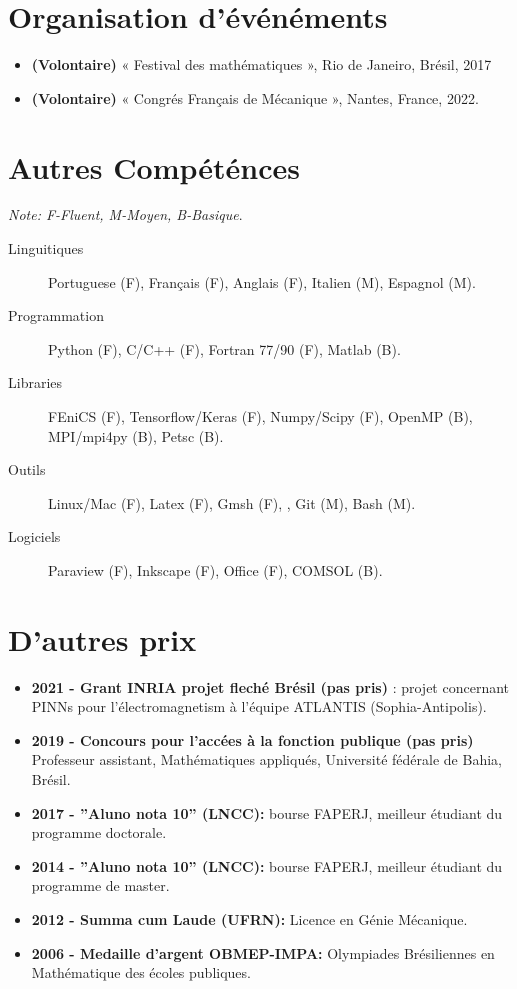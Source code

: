 \documentclass[french]{article}
\begin{document}
\section*{Organisation d'événéments}
\begin{itemize}
\item \textbf{(Volontaire)} « Festival des mathématiques », Rio de Janeiro, Brésil, 2017
\item \textbf{(Volontaire)} « Congrés Français de Mécanique », Nantes, France, 2022.
\end{itemize}

\section*{Autres Compéténces}
\textit{Note: F-Fluent, M-Moyen, B-Basique}. 
\begin{description}
\item[Linguitiques] Portuguese (F), Français (F), Anglais (F), Italien (M), Espagnol (M).
\item[Programmation] Python (F), C/C++ (F), Fortran 77/90 (F), Matlab (B).
\item[Libraries] FEniCS (F), Tensorflow/Keras (F), Numpy/Scipy (F), OpenMP (B), MPI/mpi4py (B), Petsc (B). 
\item[Outils] Linux/Mac (F), Latex (F), Gmsh (F), , Git (M), Bash (M). 
\item[Logiciels] Paraview (F), Inkscape (F), Office (F), COMSOL (B).
\end{description}

\section*{D'autres prix}
\begin{itemize}
\item \textbf{2021 - Grant INRIA projet fleché Brésil (pas pris)} : projet concernant PINNs pour l'électromagnetism à l'équipe ATLANTIS (Sophia-Antipolis).
\item \textbf{2019 - Concours pour l'accées à la fonction publique (pas pris)} Professeur assistant, Mathématiques appliqués, Université fédérale de Bahia, Brésil.
\item \textbf{2017 - ''Aluno nota 10'' (LNCC):} bourse FAPERJ, meilleur étudiant du programme doctorale.
\item \textbf{2014 - ''Aluno nota 10'' (LNCC):} bourse FAPERJ, meilleur étudiant du programme de master.
\item \textbf{2012 - Summa cum Laude (UFRN): } Licence en Génie Mécanique.
\item \textbf{2006 - Medaille d'argent OBMEP-IMPA:} Olympiades Brésiliennes en Mathématique des écoles publiques.
\end{itemize}
\end{document}
